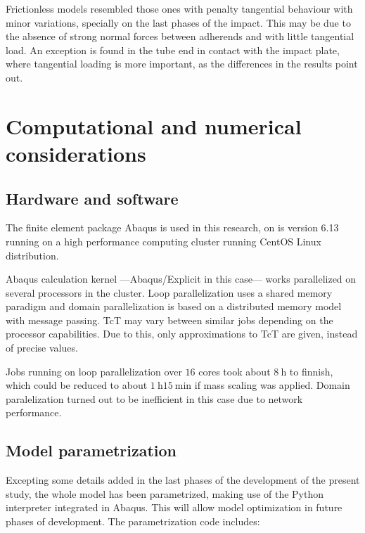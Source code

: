 \documentclass[
documentsize = a4, %
font = cmr, %
typesize = 11, %
printmode = true,
onehalfspacing = true,
language = en, %
titlepage = udciccp, %
degree = pt, %
dedication = true,
acknowledgements = true,
abstract-en = true,
abstract-es = false,
abstract-ga = false,
epigraphs = true,
toc = true,
lof = true,
lot = true,
frontmatterintoc = false,
notation = false,
minimal = false,
]{UDCthesis}
\begin{document}
Frictionless models resembled those ones with penalty tangential behaviour with minor variations, specially on the last phases of the impact. This may be due to the absence of strong normal forces between adherends and with little tangential load. An exception is found in the tube end in contact with the impact plate, where tangential loading is more important, as the differences in the results point out.

\section{Computational and numerical considerations}

\subsection{Hardware and software}

The finite element package Abaqus is used in this research, on is version 6.13 \citep{Abaqus613Manual} running on a high performance computing cluster running CentOS Linux distribution.

Abaqus calculation kernel ---Abaqus/Explicit in this case--- works parallelized on several processors in the cluster. Loop parallelization uses a shared memory paradigm and domain parallelization is based on a distributed memory model with message passing. \Gls{TcT} may vary between similar jobs depending on the processor capabilities. Due to this, only approximations to \gls{TcT} are given, instead of precise values.

Jobs running on loop parallelization over $16$ cores took about $\SI{8}{\hour}$ to finnish, which could be reduced to about $\SI{1}{\hour}$$\SI{15}{\minute}$ if mass scaling was applied. Domain paralelization turned out to be inefficient in this case due to network performance.


\subsection{Model parametrization}
\label{sec:script}

Excepting some details added in the last phases of the development of the present study, the whole model has been parametrized, making use of the Python interpreter integrated in Abaqus. This will allow model optimization in future phases of development. The parametrization code includes:
\end{document}
